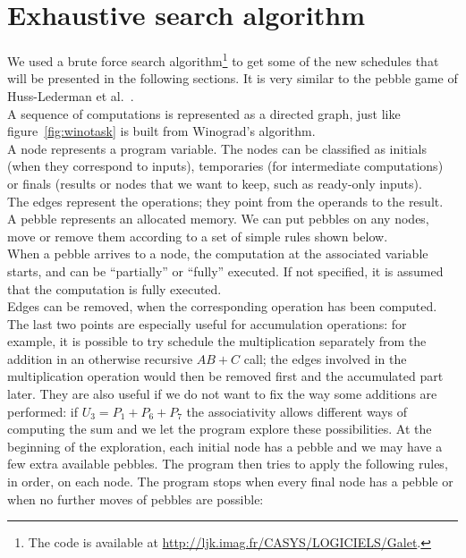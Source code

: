 \documentclass{article}
\begin{document}
\section{Exhaustive search algorithm}\label{sec:pebble}
We used a brute force search algorithm\footnote{The code is available
  at \url{http://ljk.imag.fr/CASYS/LOGICIELS/Galet}.} to get some of the new
schedules that will be presented in the following sections.
It is very similar to the pebble game of
Huss-Lederman et al.\ \cite{Huss-Lederman:1996:mai}.\\A sequence of computations is represented as a directed graph, just like figure~\ref{fig:winotask} is built from Winograd's algorithm.\\
A node represents a program variable. The nodes can be classified as initials (when they correspond to inputs), temporaries
(for intermediate computations) or finals (results or nodes that we want to
keep, such as ready-only inputs).\\
The edges represent the operations; they point from the operands to the result.\\
A pebble represents an allocated memory. We can put pebbles on any
nodes, move or remove them according to a set of simple rules shown below.\\
When a pebble arrives to a node, the computation at the associated
variable starts, and can be ``partially'' or ``fully''
executed. If not specified, it is assumed that the computation is
fully executed.\\
Edges can be removed, when the corresponding operation has been
computed.\\
The last two points are especially useful for accumulation
operations: for example, it is possible to try schedule the multiplication
separately from the addition in an otherwise recursive $AB+C$ call;
the edges involved in the multiplication operation would then be removed first and the accumulated part later.
They are also useful if we do not want to fix the way some additions are
performed: if $U_3 = P_1 + P_6  + P_7$ the associativity allows
different ways of computing the sum and we let the program explore
these possibilities.
At the beginning of the exploration, each initial node has a pebble
and we may have a few extra available pebbles. 
The program then tries to apply the following rules, in order, on each
node. The program stops when every final node has a pebble or when
no further moves of pebbles are possible:
\end{document}
